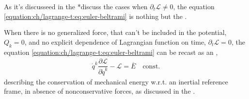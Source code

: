 \documentclass[letterpaper,10pt,english]{jupyterBook}
\begin{document}
\sphinxAtStartPar
As it’s discusseed in the {\hyperref[\detokenize{ch/lagrange-t-no:classical-mechanics-lagrange-time-independent}]{}}    *discuss the cases when \(\partial_t \mathscr{L} \ne 0\), the equation \eqref{equation:ch/lagrange-t:eq:euler-beltrami} is nothing but the .

\sphinxAtStartPar
When there is no generalized force, that can’t be included in the potential, \(Q_k  = 0\), and no explicit dependence of Lagrangian function on time, \(\partial_t \mathscr{L} = 0\), the equation \eqref{equation:ch/lagrange-t:eq:euler-beltrami} can be recast as an ,
\begin{equation*}
\begin{split}\dot{q}^k \dfrac{\partial \mathscr{L}}{\partial \dot{q}^k} - \mathscr{L} = \overline{E} \quad \text{const.}\end{split}
\end{equation*}
\sphinxAtStartPar
describing the conservation of mechanical energy w.r.t. an inertial reference frame, in absence of non\sphinxhyphen{}conservative forces, as discussed in the .

\sphinxstepscope
\end{document}

